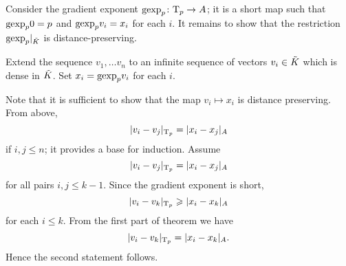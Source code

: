 Consider the gradient exponent $\gexp_p\:\T_p\to A$;
it is a short map such that $\gexp_p0=p$ and $\gexp_p v_i=x_i$ for each $i$.
It remains to show that the restriction $\gexp_p|_{\~K}$ is distance-preserving.

Extend the sequence $v_1,\dots v_n$ to an infinite sequence of vectors $v_i\in\~K$ which is dense in $\~K$.
Set $x_i=\gexp_pv_i$ for each $i$.

Note that it is sufficient to show that the map $v_i\mapsto x_i$ is distance preserving.
From above,
\[|v_i-v_j|_{\T_p}=|x_i-x_j|_A\]
if $i,j\le n$; it provides a base for induction.
Assume 
\[|v_i-v_j|_{\T_p}=|x_i-x_j|_A\]
for all pairs $i,j\le k-1$.
Since the gradient exponent is short,
\[|v_i-v_k|_{\T_p}\ge|x_i-x_k|_A\]
for each $i\le k$.
From the first part of theorem we have 
\[|v_i-v_k|_{\T_p}=|x_i-x_k|_A.\]
Hence the second statement follows.
\qeds
